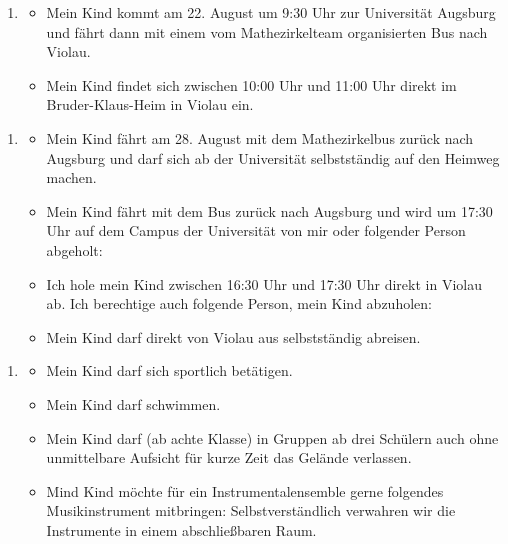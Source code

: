 \documentclass[13pt]{zettel}
\newenvironment{themabox}[1]{%
  \vspace{-0.8em}%
  \begin{enumerate}[labelindent=0pt,labelwidth=2.35cm,itemindent=0em,leftmargin=!,align=left]
    \item[\textbf{#1}]
      \begin{itemize}
}{\end{itemize}\end{enumerate}\vspace{-0.3em}}
\begin{document}
\newpage
\vspace*{-1.5cm}
\enlargethispage{1.0cm}
\small
\singlespacing

\begin{shaded}\begin{themabox}{Anreise}
\item Mein Kind kommt am 22. August um 9:30 Uhr zur Universität Augsburg und fährt dann mit einem vom Mathezirkelteam organisierten Bus nach Violau.
\item Mein Kind findet sich zwischen 10:00 Uhr und 11:00 Uhr direkt im Bruder-Klaus-Heim in Violau ein.
\end{themabox}
\end{shaded}
\vspace{-0.5cm}

\begin{shaded}\begin{themabox}{Abreise}
\item Mein Kind fährt am 28. August mit dem Mathezirkelbus zurück nach Augsburg und darf sich ab der Universität selbstständig auf den Heimweg machen.
\item Mein Kind fährt mit dem Bus zurück nach Augsburg und wird um 17:30 Uhr auf dem Campus der Universität von mir oder folgender Person abgeholt:
\\[0.3cm] \freist{13cm}
\item Ich hole mein Kind zwischen 16:30 Uhr und 17:30 Uhr direkt in Violau ab. Ich berechtige auch folgende Person, mein Kind abzuholen:
\\[0.3cm] \freist{13cm}
\item Mein Kind darf direkt von Violau aus selbstständig abreisen.
\end{themabox}
\end{shaded}

\vspace{-0.5cm}
\begin{shaded}\begin{themabox}{Aktivitäten}
\item Mein Kind darf sich sportlich betätigen.
\item Mein Kind darf schwimmen.
\item Mein Kind darf (ab achte Klasse) in Gruppen ab drei Schülern
auch ohne unmittelbare Aufsicht für kurze Zeit das Gelände verlassen.
\item Mind Kind möchte für ein Instrumentalensemble gerne folgendes Musikinstrument mitbringen:
\freist{7cm} Selbstverständlich verwahren wir die Instrumente in einem
abschließbaren Raum.
\end{themabox}
\end{shaded}
\vspace{-0.5cm}
\end{document}
